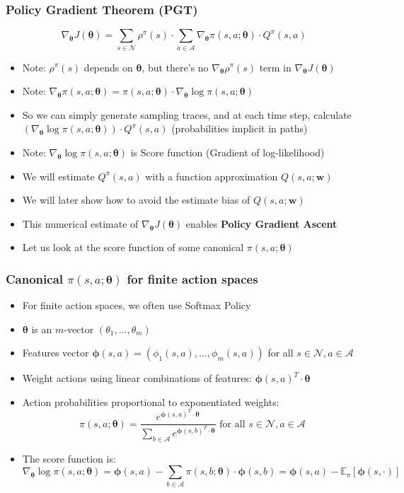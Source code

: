 \documentclass[handout]{beamer}
\begin{document}
\begin{frame}
\frametitle{Policy Gradient Theorem (PGT)}
\pause
\begin{theorem}
$$\nabla_{\bm{\theta}} J(\bm{\theta}) = \sum_{s \in \mathcal{N}} \rho^{\pi}(s) \cdot \sum_{a \in \mathcal{A}} \nabla_{\bm{\theta}} \pi(s,a; \bm{\theta}) \cdot Q^{\pi}(s,a)$$
\end{theorem}
\pause
\begin{itemize}[<+->]
\item Note: $\rho^{\pi}(s)$ depends on $\bm{\theta}$, but there's no $\nabla_{\bm{\theta}} \rho^{\pi}(s)$ term in $\nabla_{\bm{\theta}} J(\bm{\theta})$
\item Note: $\nabla_{\bm{\theta}} \pi(s,a; \bm{\theta}) = \pi(s,a;\bm{\theta}) \cdot \nabla_{\bm{\theta}} \log{\pi(s,a; \bm{\theta})}$
\item So we can simply generate sampling traces, and at each time step, calculate $(\nabla_{\bm{\theta}} \log{\pi(s,a; \bm{\theta})}) \cdot Q^{\pi}(s,a)$ (probabilities implicit in paths)
\item Note: $\nabla_{\bm{\theta}} \log{\pi(s,a; \bm{\theta})}$ is Score function (Gradient of log-likelihood)
\item We will estimate $Q^{\pi}(s,a)$ with a function approximation $Q(s,a;\bm{w})$
\item We will later show how to avoid the estimate bias of $Q(s,a;\bm{w})$
\item This numerical estimate of $\nabla_{\bm{\theta}} J(\bm{\theta})$ enables {\bf Policy Gradient Ascent}
\item Let us look at the score function of some canonical $\pi(s,a; \bm{\theta})$
\end{itemize}
\end{frame}

\begin{frame}
\frametitle{Canonical $\pi(s,a; \bm{\theta})$ for finite action spaces}
\pause
\begin{itemize}[<+->]
\item For finite action spaces, we often use Softmax Policy
\item $\bm{\theta}$ is an $m$-vector $(\theta_1, \ldots, \theta_m)$
\item Features vector $\bm{\phi}(s,a) = (\phi_1(s,a), \ldots, \phi_m(s,a))$ for all $s \in \mathcal{N}, a \in \mathcal{A}$
\item Weight actions using linear combinations of features: $\bm{\phi}(s,a)^T \cdot \bm{\theta}$
\item Action probabilities proportional to exponentiated weights:
$$\pi(s,a; \bm{\theta}) = \frac {e^{\bm{\phi}(s,a)^T \cdot \bm{\theta}}} {\sum_{b \in \mathcal{A}} e^{\bm{\phi}(s,b)^T \cdot \bm{\theta}}} \mbox{ for all } s \in \mathcal{N}, a \in \mathcal{A}$$
\item The score function is:
$$\nabla_{\bm{\theta}} \log \pi(s,a; \bm{\theta}) = \bm{\phi}(s,a) - \sum_{b \in \mathcal{A}} \pi(s,b; \bm{\theta}) \cdot \bm{\phi}(s,b) = \bm{\phi}(s,a) - \mathbb{E}_{\pi}[\bm{\phi}(s,\cdot)]$$
\end{itemize}
\end{frame}
\end{document}

